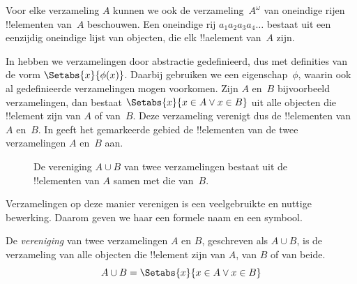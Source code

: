 \documentclass[openany]{memoir}
\begin{document}
\begin{ex}
Voor elke verzameling $A$ kunnen we ook de verzameling~$A^\omega$ van
oneindige rijen !!{element}en van~$A$ beschouwen. Een oneindige rij
$a_1a_2a_3a_4\dots$ bestaat uit een eenzijdig oneindige lijst van objecten,
die elk !!a{element} van~$A$ zijn.
\end{ex}
\endgroup

\begingroup
\def\olfilename{OLP-0008}
\def\olfilepath{content/sets-functions-relations/sets/}
\hypertarget{unit-OLP-0008}{}




\begin{explain}
In  hebben we verzamelingen door abstractie
gedefinieerd, dus met definities van de vorm $\Setabs{x}{\phi(x)}$.
Daarbij gebruiken we een eigenschap~$\phi$, waarin ook al gedefinieerde
verzamelingen mogen voorkomen. Zijn $A$ en~$B$ bijvoorbeeld verzamelingen,
dan bestaat $\Setabs{x}{x \in A \lor x \in B}$ uit alle objecten die
!!{element} zijn van $A$ of van~$B$. Deze verzameling verenigt dus de
!!{element}en van $A$ en~$B$. In  geeft het gemarkeerde
gebied de !!{element}en van de twee verzamelingen $A$ en~$B$ aan.

\begin{figure}
  \caption{De vereniging $A \cup B$ van twee verzamelingen bestaat uit de
   !!{element}en van $A$ samen met die van~$B$.}
\end{figure}

Verzamelingen op deze manier verenigen is een veelgebruikte en nuttige
bewerking. Daarom geven we haar een formele naam en een symbool.
\end{explain}

\begin{defn}[Vereniging]
De \emph{vereniging} van twee verzamelingen $A$ en $B$, geschreven als
$A \cup B$, is de verzameling van alle objecten die !!{element} zijn van
$A$, van $B$ of van beide.
\[
A \cup B = \Setabs{x}{x \in A \lor x \in B}
\]
\end{defn}
\end{document}
